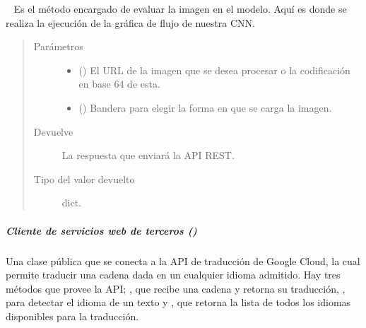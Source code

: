 \begin{fulllineitems}
\begin{fulllineitems}
\begin{fulllineitems}
\label{\detokenize{chapter_two/desc_cloudnao:app.tf_models.indoor_scenes_classifier.ImageClassifier.classify_image}}~
Es el método encargado de evaluar la imagen en el modelo. Aquí es donde
se realiza la ejecución de la gráfica de flujo de nuestra CNN.
\begin{quote}\begin{description}
\item[{Parámetros}] \leavevmode\begin{itemize}
\item {} 
 () \textendash{} El URL de la imagen que se desea procesar o la codificación en base 64 de esta.

\item {} 
 () \textendash{} Bandera para elegir la forma en que se carga la imagen.

\end{itemize}

\item[{Devuelve}] \leavevmode
La respuesta que enviará la API REST.

\item[{Tipo del valor devuelto}] \leavevmode
dict.

\end{description}\end{quote}

\end{fulllineitems}


\end{fulllineitems}



\subparagraph{Cliente de servicios web de terceros ()}
\label{\detokenize{chapter_two/desc_cloudnao:cliente-de-servicios-web-de-terceros-tpa-client-libraries}}\label{\detokenize{chapter_two/desc_cloudnao:module-app.tpa_client_libraries.google_cloud_translation}}

\begin{fulllineitems}
\label{\detokenize{chapter_two/desc_cloudnao:app.tpa_client_libraries.google_cloud_translation.GoogleCloudTranslation}}
Una clase pública que se conecta a la API de traducción de Google Cloud,
la cual permite traducir una cadena dada en un cualquier idioma admitido.
Hay tres métodos que provee la API; , que recibe una cadena y
retorna su traducción, , para detectar el idioma de un texto y
, que retorna la lista de todos los idiomas disponibles para
la traducción.


\end{fulllineitems}
\end{fulllineitems}
